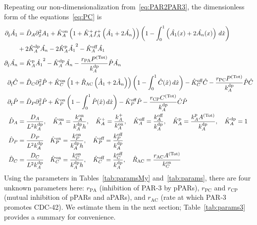 \documentclass[11pt]{article}
\newcommand{\6}[1]{#1_{\text{6}}}
\newcommand{\3}[1]{#1_{\text{3}}}
\newcommand{\Tot}[1]{#1^\text{(Tot)}}
\newcommand{\A}[1]{#1_A}
\begin{document}
Repeating our non-dimensionalization from\ \eqref{eq:PAR2PAR3}, the dimensionless form of the equations\ \eqref{eq:PC} is
\begin{subequations}
\label{eq:PCND}
\begin{align}
\nonumber
\Dthat \hat{\MA} & = \DhatA \Dxhat^2 \MA +\KhatonA \left(1+\KhatfA \A{f}^+\left(\hat{\MA}+2\hat{\PA}\right)\right)\left(1 - \int_0^1 \left(\hat{\MA}(x) + 2\hat{\PA}(x)\right) \, d\hat{x} \right) \\ 
&+ 2\KhatdpA \hat{\PA}-2\KhatpA \hat{\MA}^2 - \KhatoffA \hat{\MA} \\ 
\Dthat \hat{\PA} & =\KhatpA \hat{\MA}^2- \KhatdpA \hat{\PA}-\frac{r_\text{PA} \Tot{P}}{\kdp_A}\hat{P} \hat{\PA} \\ 
\label{eq:26c}
\Dthat \hat{C} & =\DhatC \Dxhat^2 \hat{P} +\KhatonC \left(1+\hat R_\text{AC}\left(\hat A_1+2\hat A_n\right) \right)\left(1 - \int_0^1 \hat{C}(\hat x) \, d\hat{x} \right)  - \KhatoffC \hat{C}-\frac{r_\text{PC} \Tot{P}}{\kdp_A}\hat P \hat{C} \\ 
\Dthat \hat{P} & =\DhatP \Dxhat^2 \hat{P} +\KhatonP \left(1 - \int_0^1 \hat{P}(\hat x) \, d\hat{x} \right)  - \KhatoffP \hat{P}-\frac{r_\text{CP} \Tot{C}}{\kdp_A}\hat C \hat{P} \\ 
\DhatA &=\frac{\A{D}}{L^2 \A{\kdp}}, \quad \KhatonA=\frac{\A{\kon}}{\A{\kdp} h }, \quad \KhatfA = \frac{\A{\kf}}{\A{\kon}}, \quad  \KhatoffA = \frac{\A{\koff}}{\A{\kdp}}, \quad \KhatpA = \frac{\A{\kp} \Tot{A}}{\A{\kdp}}, \quad \KhatdpA=1\\
\DhatP &=\frac{D_P}{L^2 \A{\kdp}} \quad \KhatonP=\frac{{\kon_P}}{\A{\kdp} h },\quad \KhatoffP = \frac{\koff_P}{\kdp_A}\\
\DhatC &=\frac{D_C}{L^2 \A{\kdp}} \quad \KhatonC=\frac{{\kon_C}}{\A{\kdp} h },\quad \KhatoffC = \frac{\koff_C}{\kdp_A},\quad \hat{R}_\text{AC}=\frac{r_\text{AC}\Tot{A}}{\kon_C}
\end{align}
\end{subequations}
Using the parameters in Tables\ \ref{tab:paramsMy} and\ \ref{tab:params}, there are four unknown parameters here: $r_\text{PA}$ (inhibition of PAR-3 by pPARs), $r_\text{PC}$ and $r_\text{CP}$ (mutual inhibition of pPARs and aPARs), and $r_\text{AC}$ (rate at which PAR-3 promotes CDC-42). We estimate them in the next section; Table\ \ref{tab:params3} provides a summary for convenience.
\end{document}
